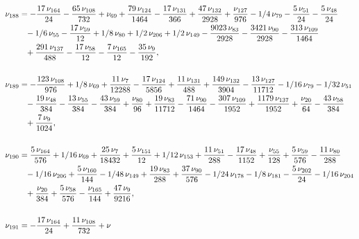 \documentclass[a4paper,12pt, DIV=14, BCOR=5mm, twoside, headsepline]{scrbook}
\begin{document}
\begin{align}\label{AreaSol17}
\begin{aligned}
\nu_{{188}}&=-{\frac {17\,\nu_{{164}}}{24}}-{\frac {65\,\nu
_{{108}}}{732}}+\nu_{{69}}+{\frac {79\,\nu_{{124}}}{1464}}-{\frac {17
\,\nu_{{131}}}{366}}+{\frac {47\,\nu_{{132}}}{2928}}+{\frac {\nu_{{127
}}}{976}}-1/4\,\nu_{{79}}-{\frac {5\,\nu_{{51}}}{24}}-{\frac {5\,\nu_{
{48}}}{24}}\\
 &\hphantom{=}-1/6\,\nu_{{55}}-{\frac {17\,\nu_{{59}}}{12}}+1/8\,\nu_{{80
}}+1/2\,\nu_{{206}}+1/2\,\nu_{{149}}-{\frac {9023\,\nu_{{83}}}{2928}}-
{\frac {3421\,\nu_{{90}}}{2928}}-{\frac {313\,\nu_{{109}}}{1464}}\\
 &\hphantom{=}+{
\frac {291\,\nu_{{137}}}{488}}-{\frac {17\,\nu_{{58}}}{12}}-{\frac {7
\,\nu_{{165}}}{12}}-{\frac {35\,\nu_{{9}}}{192}}, \\
\\
\nu_{{189}}&=-{\frac {
123\,\nu_{{108}}}{976}}+1/8\,\nu_{{69}}+{\frac {11\,\nu_{{7}}}{12288}}
-{\frac {17\,\nu_{{124}}}{5856}}+{\frac {11\,\nu_{{131}}}{488}}+{
\frac {149\,\nu_{{132}}}{3904}}-{\frac {13\,\nu_{{127}}}{11712}}-1/16
\,\nu_{{79}}-1/32\,\nu_{{51}}\\
 &\hphantom{=}-{\frac {19\,\nu_{{48}}}{384}}-{\frac {13
\,\nu_{{55}}}{384}}-{\frac {43\,\nu_{{59}}}{384}}+{\frac {\nu_{{80}}}{
96}}+{\frac {19\,\nu_{{83}}}{11712}}-{\frac {71\,\nu_{{90}}}{1464}}-{
\frac {307\,\nu_{{109}}}{1952}}+{\frac {1179\,\nu_{{137}}}{1952}}+{
\frac {\nu_{{20}}}{64}}-{\frac {43\,\nu_{{58}}}{384}}\\
 &\hphantom{=}+{\frac {7\,\nu_{
{9}}}{1024}}, \\
\\
\nu_{{190}}&={\frac {5\,\nu_{{164}}}{576}}+1/16\,\nu_{{69}
}+{\frac {25\,\nu_{{7}}}{18432}}+{\frac {5\,\nu_{{151}}}{12}}+1/12\,
\nu_{{153}}+{\frac {11\,\nu_{{51}}}{288}}-{\frac {17\,\nu_{{48}}}{1152
}}+{\frac {\nu_{{55}}}{128}}+{\frac {5\,\nu_{{59}}}{576}}-{\frac {11\,
\nu_{{80}}}{288}}\\
 &\hphantom{=}-1/16\,\nu_{{206}}+{\frac {5\,\nu_{{160}}}{144}}-1/48
\,\nu_{{149}}+{\frac {19\,\nu_{{83}}}{288}}+{\frac {37\,\nu_{{90}}}{
576}}-1/24\,\nu_{{178}}-1/8\,\nu_{{181}}-{\frac {5\,\nu_{{202}}}{24}}-
1/16\,\nu_{{204}}\\
 &\hphantom{=}+{\frac {\nu_{{20}}}{384}}+{\frac {5\,\nu_{{58}}}{576
}}-{\frac {\nu_{{165}}}{144}}+{\frac {47\,\nu_{{9}}}{9216}}, \\
\\
\nu_{{191}
}&=-{\frac {17\,\nu_{{164}}}{24}}+{\frac {11\,\nu_{{108}}}{732}}+\nu_{{
}}
\end{aligned}
\end{align}
\end{document}
